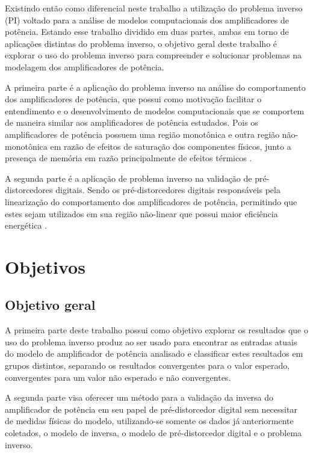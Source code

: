 Existindo então como diferencial neste trabalho a utilização do problema inverso (PI) voltado para a análise de modelos computacionais dos amplificadores de potência. Estando esse trabalho dividido em duas partes, ambas em torno de aplicações distintas do problema inverso, o objetivo geral deste trabalho é explorar o uso do problema inverso para compreender e solucionar problemas na modelagem dos amplificadores de potência.

A primeira parte é a aplicação do problema inverso na análise do comportamento dos amplificadores de potência, que possui como motivação facilitar o entendimento e o desenvolvimento de modelos computacionais que se comportem de maneira similar aos amplificadores de potência estudados. Pois os amplificadores de potência possuem uma região monotônica e outra região não-monotônica em razão de efeitos de saturação dos componentes físicos, junto a presença de memória em razão principalmente de efeitos térmicos \cite{pedro_comparative_2005}.

A segunda parte é a aplicação de problema inverso na validação de pré-distorcedores digitais. Sendo os pré-distorcedores digitais responsáveis pela linearização do comportamento dos amplificadores de potência, permitindo que estes sejam utilizados em sua região não-linear que possui maior eficiência energética \cite{kenington_high-linearity_2000}.

\section{Objetivos} \label{sec:introd-obje}

\subsection{Objetivo geral} \label{ssec:introd-obje-geral}
A primeira parte deste trabalho possui como objetivo explorar os resultados que o uso do problema inverso produz ao ser usado para encontrar as entradas atuais do modelo de amplificador de potência analisado e classificar estes resultados em grupos distintos, separando os resultados convergentes para o valor esperado, convergentes para um valor não esperado e não convergentes.

A segunda parte visa oferecer um método para a validação da inversa do amplificador de potência em seu papel de pré-distorcedor digital sem necessitar de medidas físicas do modelo, utilizando-se somente os dados já anteriormente coletados, o modelo de inversa, o modelo de pré-distorcedor digital e o problema inverso.

